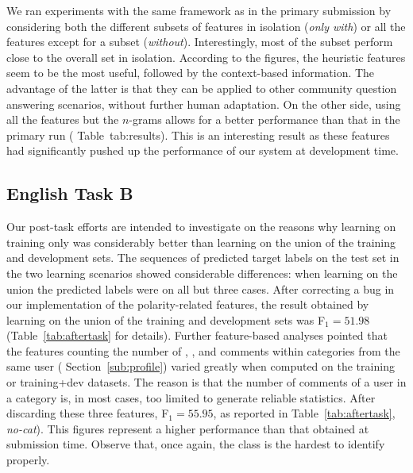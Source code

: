 We ran experiments with the same framework as in the primary submission by 
considering both the different subsets of features in isolation (\textit{only 
with}) or all the features except for a subset (\textit{without}). 
Interestingly, most of the subset perform close to the overall set in isolation. 
According to the figures, the heuristic features seem to be the most useful, 
followed by the context-based information. The advantage of the latter is that 
they can be applied to other community question answering scenarios, without 
further human adaptation. On the other side, using all the features but the 
$n$-grams allows for a better performance than that in the primary run (\cf 
Table~{tab:results}). This is an interesting result as these features had 
significantly pushed up the performance of our system at development time. 
 
 

 
\subsection{English Task B} \label{sec:discussionb}

Our post-task efforts are intended to investigate on the reasons why learning on 
training only was considerably better than learning on the union of the 
training and development sets. The sequences of predicted target labels on the 
test set in the two learning scenarios showed considerable differences: when 
learning on the union the predicted labels were \yes on all but three cases. 
After correcting a bug in our implementation of the polarity-related features, 
the result obtained by learning on the union of the training and development 
sets was F$_1=51.98$ (\cf Table~\ref{tab:aftertask} for details). Further 
feature-based analyses pointed that the features counting the number of \good, 
\bad, and \pot comments within categories from the same user (\cf 
Section~\ref{sub:profile}) varied greatly when computed on the training or 
training+dev datasets. The reason is that the number of comments of a user in a 
category is, in most cases, too limited to generate reliable statistics. After 
discarding these three features, F$_1 = 55.95$, as reported in 
Table~\ref{tab:aftertask}, \textit{no-cat}). This figures represent a higher 
performance than that obtained at submission time. Observe that, once again, the 
\unsure class is the hardest to identify properly.

